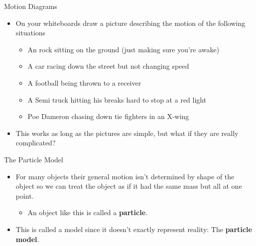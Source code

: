 \documentclass{beamer}
\begin{document}
\begin{frame}{Motion Diagrams}
\begin{itemize}
   \item<1-> On your whiteboards draw a picture describing the motion of the following situations
   \begin{itemize}[<+>]
      \item An rock sitting on the ground (just making sure you're awake)
      \item A car racing down the street but not changing speed
   \end{itemize}
   \pause
   \begin{itemize}[<+>]
      \item A football being thrown to a receiver
      \item A Semi truck hitting his breaks hard to stop at a red light
      \item Poe Dameron chasing down tie fighters in an X-wing
   \end{itemize}
   \item <7> This works as long as the pictures are simple, but what if they are really complicated?
\end{itemize}
\end{frame}

\begin{frame}{The Particle Model}
\begin{itemize}
   \item For many objects their general motion isn't determined by shape of the object so we can treat the object as if it had the same mass but all at one point.
   \begin{itemize}
      \item An object like this is called a \textbf{particle}.
   \end{itemize}
   \item This is called a model since it doesn't exactly represent reality: The \textbf{particle model}.
\end{itemize}
\end{frame}
\end{document}
